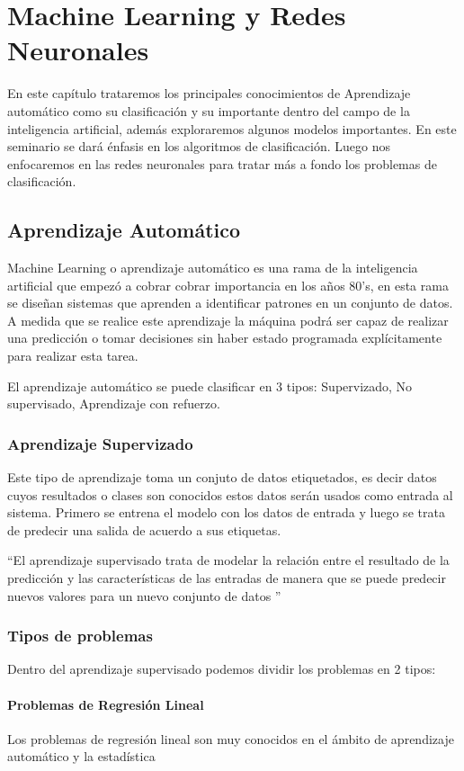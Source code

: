\chapter{Machine Learning y Redes Neuronales}

En este capítulo trataremos los principales conocimientos de Aprendizaje automático como su clasificación y su importante dentro del campo de la inteligencia artificial, además exploraremos algunos modelos importantes. 
En este seminario se dará énfasis en los algoritmos de clasificación. Luego nos enfocaremos en las redes neuronales para tratar más a fondo los problemas de clasificación.

\section{Aprendizaje Automático}
Machine Learning o aprendizaje automático es una rama de la inteligencia artificial que empezó a cobrar cobrar importancia en los años 80's, en esta rama se diseñan sistemas que aprenden a identificar patrones en un conjunto de datos. A medida que se realice este aprendizaje la máquina podrá ser capaz de realizar una predicción o tomar decisiones sin haber estado programada explícitamente para realizar esta tarea.


El aprendizaje automático se puede clasificar en 3 tipos: Supervizado, No supervisado, Aprendizaje con refuerzo.\cite{WEBSITE:2}
\subsection{Aprendizaje Supervizado}
Este tipo de aprendizaje  toma un conjuto de datos etiquetados, es decir datos cuyos resultados o clases son conocidos estos datos serán usados como entrada al sistema. Primero se entrena el modelo con los datos de entrada y luego se trata de predecir  una salida de acuerdo a sus etiquetas.

 \textquotedblleft El aprendizaje supervisado trata de modelar la relación entre el resultado de la predicción y las características de las entradas de manera que se puede predecir nuevos valores para un nuevo conjunto de datos \textquotedblright \cite{WEBSITE:1}
\subsection*{Tipos de problemas}
Dentro del aprendizaje supervisado podemos dividir los problemas en 2 tipos:
\subsubsection*{Problemas de Regresión Lineal}
Los problemas de regresión lineal son muy conocidos en el ámbito de aprendizaje automático y la estadística 
